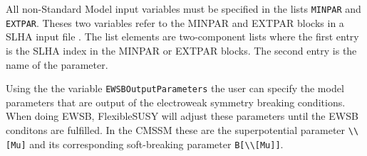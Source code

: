 \documentclass[final,3p,11pt,pdflatex]{elsarticle}
\newcommand{\fs}{FlexibleSUSY\xspace}
\newcommand{\code}[1]{\lstinline|#1|}  %
\begin{document}
All non-Standard Model input variables must be specified in the lists
\code{MINPAR} and \code{EXTPAR}.  Theses two variables refer to the
MINPAR and EXTPAR blocks in a SLHA input file \cite{Skands:2003cj}.
The list elements are two-component lists where the first entry is the
SLHA index in the MINPAR or EXTPAR blocks.  The second entry is the
name of the parameter.

Using the the variable \code{EWSBOutputParameters} the user can
specify the model parameters that are output of the electroweak
symmetry breaking conditions.  When doing EWSB, \fs will adjust these
parameters until the EWSB conditons are fulfilled.  In the CMSSM these
are the superpotential parameter \code{\\[Mu]} and its corresponding
soft-breaking parameter \code{B[\\[Mu]]}.
\end{document}
